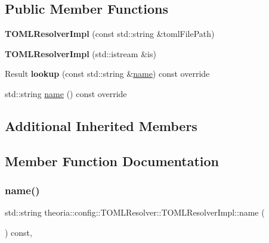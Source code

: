 \subsection*{Public Member Functions}
\begin{DoxyCompactItemize}
\item 
\mbox{\label{classTOMLResolver_1_1TOMLResolverImpl_a297c93ec008519e79192844d483273ac}} 
{\bfseries T\+O\+M\+L\+Resolver\+Impl} (const std\+::string \&toml\+File\+Path)
\item 
\mbox{\label{classTOMLResolver_1_1TOMLResolverImpl_acee3fe2b048200875c6ee00aacad76ac}} 
{\bfseries T\+O\+M\+L\+Resolver\+Impl} (std\+::istream \&is)
\item 
\mbox{\label{classTOMLResolver_1_1TOMLResolverImpl_aebc6940c543f3b12484aa2735a6fcf1b}} 
Result {\bfseries lookup} (const std\+::string \&\hyperlink{classTOMLResolver_1_1TOMLResolverImpl_a5b9f36aca6c20a81b18b078fa74c3c14}{name}) const override
\item 
std\+::string \hyperlink{classTOMLResolver_1_1TOMLResolverImpl_a5b9f36aca6c20a81b18b078fa74c3c14}{name} () const override
\end{DoxyCompactItemize}
\subsection*{Additional Inherited Members}


\subsection{Member Function Documentation}
\mbox{\label{classTOMLResolver_1_1TOMLResolverImpl_a5b9f36aca6c20a81b18b078fa74c3c14}} 
\subsubsection{\texorpdfstring{name()}{name()}}
{\footnotesize\ttfamily std\+::string theoria\+::config\+::\+T\+O\+M\+L\+Resolver\+::\+T\+O\+M\+L\+Resolver\+Impl\+::name (\begin{DoxyParamCaption}{ }\end{DoxyParamCaption}) const\hspace{0.3cm}{\ttfamily [override]}, {\ttfamily [virtual]}}

